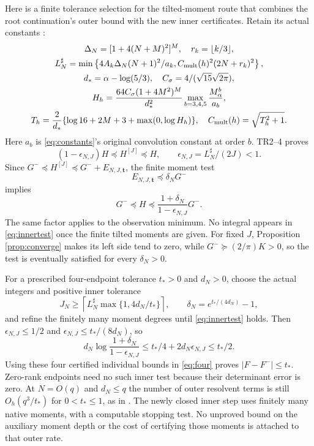 \documentclass[11pt]{article}
\begin{document}
Here is a finite tolerance selection for the tilted-moment route that
combines the root continuation's outer bound with the new inner
certificates.  Retain its actual constants \cite{TR}:
\begin{equation}\label{eq:Lsharp}
 \begin{gathered}
 \Delta_N=[1+4(N+M)^2]^M,\quad r_k=\lfloor k/3\rfloor,\\
 L_N^\sharp=\min\left\{4A_k\Delta_N(N+1)^2/a_k,
                  C_{\rm mult}(h)^2(2N+r_k)^2\right\},\\
 d_*=\alpha-\log(5/3),\quad C_\sigma=4/(\sqrt{15}\sqrt{2\pi}),\\
 H_h=\frac{64C_\sigma(1+4M^2)^M}{d_*^2}
                   \max_{b=3,4,5}\frac{M_\alpha^b}{a_b},\\
 T_h=\frac2{d_*}\{\log16+2M+3+\max(0,\log H_h)\},
 \quad C_{\rm mult}(h)=\sqrt{T_h^2+1}.
 \end{gathered}
\end{equation}
Here $a_b$ is \eqref{eq:constants}'s original convolution constant
at order $b$.  TR2--4 proves
\begin{equation}\label{eq:outerrelative}
 (1-\epsilon_{N,J})H\preceq H^{[J]}\preceq H,
 \qquad\epsilon_{N,J}=L_N^\sharp/(2J)<1.
\end{equation}
Since $G^-\preceq H^{[J]}\preceq G^-+E_{N,J,\mathbf t}$,
the finite moment test
\begin{equation}\label{eq:innertest}
 E_{N,J,\mathbf t}\preceq\delta_NG^-
\end{equation}
implies
\begin{equation}\label{eq:jointrelative}
 G^-\preceq H\preceq
 \frac{1+\delta_N}{1-\epsilon_{N,J}}G^-.
\end{equation}
The same factor applies to the observation minimum.  No integral
appears in \eqref{eq:innertest} once the finite tilted moments are
given.  For fixed $J$, Proposition \ref{prop:converge} makes its left
side tend to zero, while $G^-\succeq(2/\pi)K>0$, so the test is
eventually satisfied for every $\delta_N>0$.

For a prescribed four-endpoint tolerance $t_*>0$ and $d_N>0$, choose
the actual integers and positive inner tolerance
\begin{equation}\label{eq:tolerance}
 J_N\ge\left\lceil L_N^\sharp\max\{1,4d_N/t_*\}\right\rceil,
 \qquad\delta_N=e^{t_*/(4d_N)}-1,
\end{equation}
and refine the finitely many moment degrees until \eqref{eq:innertest}
holds.  Then $\epsilon_{N,J}\le1/2$ and
$\epsilon_{N,J}\le t_*/(8d_N)$, so
\[
 d_N\log\frac{1+\delta_N}{1-\epsilon_{N,J}}
 \le t_*/4+2d_N\epsilon_{N,J}\le t_*/2.
\]
Using these four certified individual bounds in \eqref{eq:four}
proves $|F-F^-|\le t_*$.  Zero-rank endpoints need no such inner
test because their determinant error is zero.  At $N=O(q)$ and
$d_N\le q$ the number of outer resolvent terms is still
$O_h(q^3/t_*)$ for $0<t_*\le1$, as in \cite{TR}.  The newly closed
inner step uses finitely many native moments, with a computable
stopping test.  No unproved bound on the auxiliary moment depth or
the cost of certifying those moments is attached to that outer rate.
\end{document}
